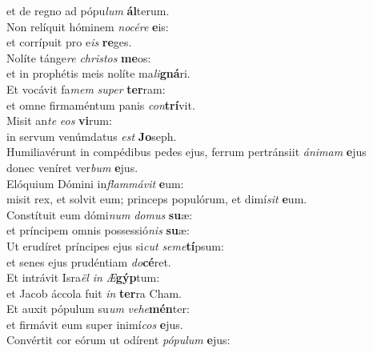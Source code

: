 \oddverse et de regno ad pópu\textit{lum} \textbf{ál}terum.\\
\evenverse Non relíquit hóminem \textit{no}\textit{cé}\textit{re} \textbf{e}is:~\*\\
\evenverse et corrípuit pro e\textit{is} \textbf{re}ges.\\
\oddverse Nolíte tánge\textit{re} \textit{chri}\textit{stos} \textbf{me}os:~\*\\
\oddverse et in prophétis meis nolíte ma\textit{li}\textbf{gná}ri.\\
\evenverse Et vocávit fa\textit{mem} \textit{su}\textit{per} \textbf{ter}ram:~\*\\
\evenverse et omne firmaméntum panis \textit{con}\textbf{trí}vit.\\
\oddverse Misit an\textit{te} \textit{e}\textit{os} \textbf{vi}rum:~\*\\
\oddverse in servum venúmdatus \textit{est} \textbf{Jo}seph.\\
\evenverse Humiliavérunt in compédibus pedes ejus, ferrum pertránsiit \textit{á}\textit{ni}\textit{mam} \textbf{e}jus~\*\\
\evenverse donec veníret ver\textit{bum} \textbf{e}jus.\\
\oddverse Elóquium Dómini in\textit{flam}\textit{má}\textit{vit} \textbf{e}um:~\*\\
\oddverse misit rex, et solvit eum; princeps populórum, et dimí\textit{sit} \textbf{e}um.\\
\evenverse Constítuit eum dómi\textit{num} \textit{do}\textit{mus} \textbf{su}æ:~\*\\
\evenverse et príncipem omnis possessió\textit{nis} \textbf{su}æ:\\
\oddverse Ut erudíret príncipes ejus si\textit{cut} \textit{se}\textit{me}\textbf{tí}psum:~\*\\
\oddverse et senes ejus prudéntiam \textit{do}\textbf{cé}ret.\\
\evenverse Et intrávit Isra\textit{ël} \textit{in} \textit{Æ}\textbf{gýp}tum:~\*\\
\evenverse et Jacob áccola fuit \textit{in} \textbf{ter}ra Cham.\\
\oddverse Et auxit pópulum su\textit{um} \textit{ve}\textit{he}\textbf{mén}ter:~\*\\
\oddverse et firmávit eum super inimí\textit{cos} \textbf{e}jus.\\
\evenverse Convértit cor eórum ut odírent \textit{pó}\textit{pu}\textit{lum} \textbf{e}jus:~\*\\
